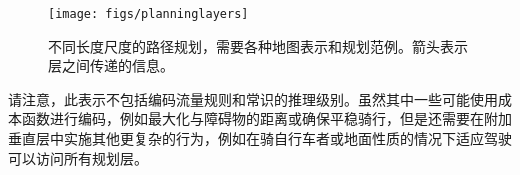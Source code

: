 \begin{figure}
\centering
\texttt{[image: figs/planninglayers]}
\caption{不同长度尺度的路径规划，需要各种地图表示和规划范例。箭头表示层之间传递的信息。
\label{fig:planninglayers}}
\end{figure}


请注意，此表示不包括编码流量规则和常识的推理级别。虽然其中一些可能使用成本函数进行编码，例如最大化与障碍物的距离或确保平稳骑行，但是还需要在附加垂直层中实施其他更复杂的行为，例如在骑自行车者或地面性质的情况下适应驾驶 可以访问所有规划层。




